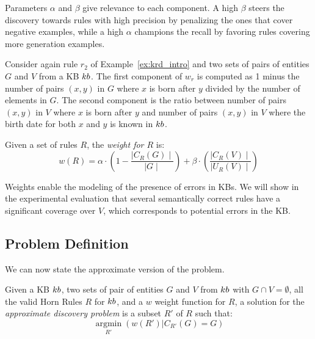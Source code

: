 Parameters $\alpha$ and $\beta$ give relevance to each component. A high $\beta$ steers the discovery towards rules with high precision by penalizing the ones that cover negative examples, %
while a high $\alpha$ champions the recall by favoring rules covering more generation examples. %

\begin{example}
	Consider again rule $r_2$ of Example~\ref{ex:krd_intro} 
	and two sets of pairs of entities $G$ and $V$ from a KB ${\sc kb}$. 
The first component of $w_r$ is computed as 1 minus the number of pairs $(x,y)$ in $G$ where
		$x$ is born after $y$ divided by the number of elements in $G$.
The second component is the ratio between number of pairs $(x,y)$ in $V$ where $x$ is born after $y$ and number of pairs $(x,y)$ in $V$ where the birth date for both $x$ and $y$ is known in ${\sc kb}$.
\end{example}

\begin{definition}
\label{def:totCost}
	Given a set of rules $R$, the {\em weight for $R$} is:
	\begin{equation*}
		w(R) = \alpha \cdot (1-\frac{\mid C_{R}(G)\mid}{\mid G \mid}) +\beta \cdot (\frac{\mid C_{R}(V) \mid}{\mid U_{R}(V)\mid})
	\end{equation*}
\end{definition}

Weights enable the modeling of the presence of errors in KBs. We will show in the experimental evaluation that several semantically correct rules have a significant coverage over $V$, which corresponds to potential errors in the KB. 

\vspace{-1ex}	
\subsection{Problem Definition} \label{sec:krd_prob_def}	
We can now state the approximate version of the problem.

\begin{definition}
	Given a KB ${\sc kb}$, two sets of pair of entities $G$ and $V$ from ${\sc kb}$ with $G \cap V = \emptyset$, all the valid Horn Rules $R$ for ${\sc kb}$, and a $w$ weight function for $R$, a solution for the \emph{approximate discovery problem} is a subset $R'$ of $R$  such that:
%
	$$\underset{R'}{\operatorname{argmin}}(w(R') | C_{R'}(G) = G)$$
\end{definition}
\vspace{-1ex}	


